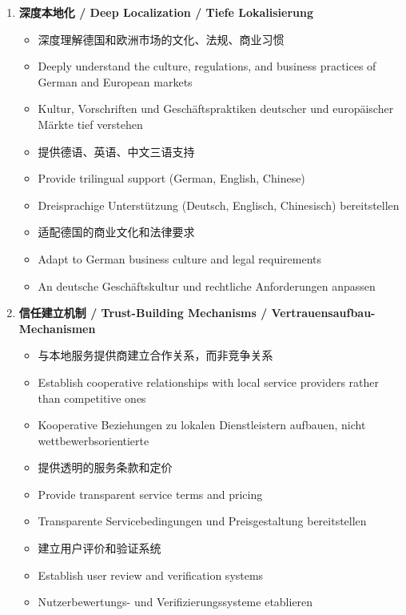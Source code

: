 \documentclass[11pt,a4paper]{article}
\begin{document}
\begin{enumerate}
    \item \textbf{深度本地化 / Deep Localization / Tiefe Lokalisierung}
    \begin{itemize}
        \item 深度理解德国和欧洲市场的文化、法规、商业习惯
        \item Deeply understand the culture, regulations, and business practices of German and European markets
        \item Kultur, Vorschriften und Geschäftspraktiken deutscher und europäischer Märkte tief verstehen
        \item 提供德语、英语、中文三语支持
        \item Provide trilingual support (German, English, Chinese)
        \item Dreisprachige Unterstützung (Deutsch, Englisch, Chinesisch) bereitstellen
        \item 适配德国的商业文化和法律要求
        \item Adapt to German business culture and legal requirements
        \item An deutsche Geschäftskultur und rechtliche Anforderungen anpassen
    \end{itemize}
    
    \item \textbf{信任建立机制 / Trust-Building Mechanisms / Vertrauensaufbau-Mechanismen}
    \begin{itemize}
        \item 与本地服务提供商建立合作关系，而非竞争关系
        \item Establish cooperative relationships with local service providers rather than competitive ones
        \item Kooperative Beziehungen zu lokalen Dienstleistern aufbauen, nicht wettbewerbsorientierte
        \item 提供透明的服务条款和定价
        \item Provide transparent service terms and pricing
        \item Transparente Servicebedingungen und Preisgestaltung bereitstellen
        \item 建立用户评价和验证系统
        \item Establish user review and verification systems
        \item Nutzerbewertungs- und Verifizierungssysteme etablieren
    \end{itemize}
    

\end{enumerate}
\end{document}
